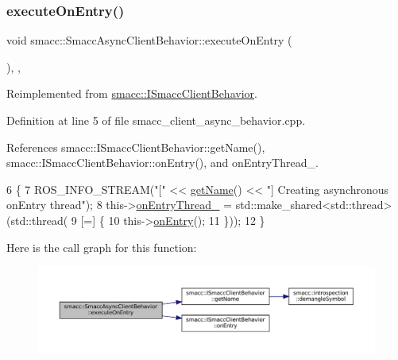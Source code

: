 \subsubsection{\texorpdfstring{execute\+On\+Entry()}{executeOnEntry()}}
{\footnotesize\ttfamily void smacc\+::\+Smacc\+Async\+Client\+Behavior\+::execute\+On\+Entry (\begin{DoxyParamCaption}{ }\end{DoxyParamCaption})\hspace{0.3cm}{\ttfamily [override]}, {\ttfamily [protected]}, {\ttfamily [virtual]}}



Reimplemented from \hyperlink{classsmacc_1_1ISmaccClientBehavior_a90b7032f7520f9e7e805835e6ed9d43e}{smacc\+::\+I\+Smacc\+Client\+Behavior}.



Definition at line 5 of file smacc\+\_\+client\+\_\+async\+\_\+behavior.\+cpp.



References smacc\+::\+I\+Smacc\+Client\+Behavior\+::get\+Name(), smacc\+::\+I\+Smacc\+Client\+Behavior\+::on\+Entry(), and on\+Entry\+Thread\+\_\+.


\begin{DoxyCode}
6     \{
7         ROS\_INFO\_STREAM(\textcolor{stringliteral}{"["} << \hyperlink{classsmacc_1_1ISmaccClientBehavior_a18e4bec9460b010f2894c0f7e7064a34}{getName}() << \textcolor{stringliteral}{"] Creating asynchronous onEntry thread"});
8         this->\hyperlink{classsmacc_1_1SmaccAsyncClientBehavior_a8b7bacf092d8b4de0bb3764bae43c181}{onEntryThread\_} = std::make\_shared<std::thread>(std::thread(
9             [=] \{
10                 this->\hyperlink{classsmacc_1_1ISmaccClientBehavior_a3ec24a839087c550e1d62a81e48cf530}{onEntry}();
11             \}));
12     \}
\end{DoxyCode}
Here is the call graph for this function\+:
\nopagebreak
\begin{figure}[H]
\begin{center}
\leavevmode
\includegraphics[width=350pt]{classsmacc_1_1SmaccAsyncClientBehavior_ab8ca63d40d61554263466fe4c0b5cbd1_cgraph}
\end{center}
\end{figure}
\mbox{\label{classsmacc_1_1SmaccAsyncClientBehavior_a3d982d370df4f133ad37c0b2370e9b82}} 
